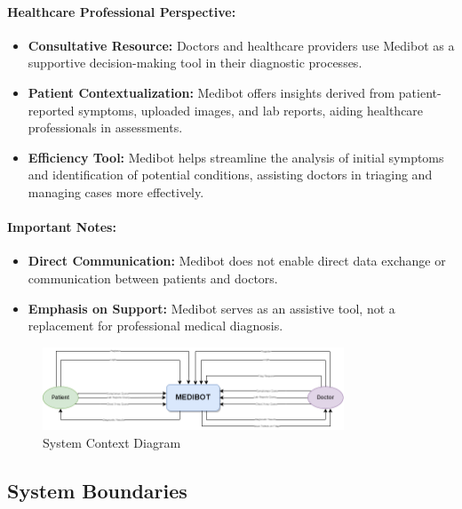\paragraph{Healthcare Professional Perspective:}
\begin{itemize}
    \item \textbf{Consultative Resource:} Doctors and healthcare providers use Medibot as a supportive decision-making tool in their diagnostic processes.
    \item \textbf{Patient Contextualization:} Medibot offers insights derived from patient-reported symptoms, uploaded images, and lab reports, aiding healthcare professionals in assessments.
    \item \textbf{Efficiency Tool:} Medibot helps streamline the analysis of initial symptoms and identification of potential conditions, assisting doctors in triaging and managing cases more effectively.
\end{itemize}

\paragraph{Important Notes:}
\begin{itemize}
    \item \textbf{Direct Communication:} Medibot does not enable direct data exchange or communication between patients and doctors.
    \item \textbf{Emphasis on Support:} Medibot serves as an assistive tool, not a replacement for professional medical diagnosis.
\end{itemize}

\begin{figure}[H]  %
    \centering
    \includegraphics[width=0.8\textwidth]{./Figures/System Context.png}
    \caption{System Context Diagram}
    \label{fig:mysvg}
\end{figure}


\subsection{System Boundaries}

